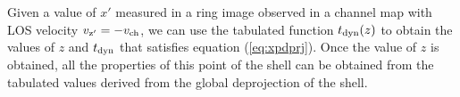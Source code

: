 \documentclass[12pt]{mythesis}
\begin{document}

Given a value of $x'$ measured in a ring image observed in a channel map with LOS velocity $v_{\rm z'}=-v_{\rm ch}$, we can use the tabulated function $t_{\rm dyn}(z)$ to obtain the values of $z$ and $t_{\rm dyn}$ that satisfies equation (\ref{eq:xpdprj}). Once the value of $z$ is obtained, all the properties of this point of the shell can be obtained from the tabulated values derived from the global deprojection of the shell.


\end{document}
